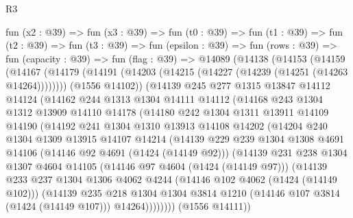 \begin{lexlean}{R3}
\begin{coremodule}
  fun (x2 : @39) =>
  fun (x3 : @39) =>
  fun (t0 : @39) =>
  fun (t1 : @39) =>
  fun (t2 : @39) =>
  fun (t3 : @39) =>
  fun (epsilon : @39) =>
  fun (rows : @39) =>
  fun (capacity : @39) =>
  fun (flag : @39) =>
  @14089
    (@14138
      (@14153
        (@14159
          (@14167
            (@14179 (@14191 (@14203 (@14215 (@14227 (@14239 (@14251 (@14263 @14264))))))))
            (@1556 @14102))
          (@14139
            @245
            @277
            @1315
            @13847
            @14112
            @14124
            (@14162
              @244
              @1313
              @1304
              @14111
              @14112
              (@14168
                @243
                @1304
                @1312
                @13909
                @14110
                @14178
                (@14180
                  @242
                  @1304
                  @1311
                  @13911
                  @14109
                  @14190
                  (@14192
                    @241
                    @1304
                    @1310
                    @13913
                    @14108
                    @14202
                    (@14204
                      @240
                      @1304
                      @1309
                      @13915
                      @14107
                      @14214
                      (@14139
                        @229
                        @239
                        @1304
                        @1308
                        @4691
                        @14106
                        (@14146 @92 @4691 (@1424 (@14149 @92)))
                        (@14139
                          @231
                          @238
                          @1304
                          @1307
                          @4604
                          @14105
                          (@14146 @97 @4604 (@1424 (@14149 @97)))
                          (@14139
                            @233
                            @237
                            @1304
                            @1306
                            @4062
                            @4244
                            (@14146 @102 @4062 (@1424 (@14149 @102)))
                            (@14139
                              @235
                              @218
                              @1304
                              @1304
                              @3814
                              @1210
                              (@14146 @107 @3814 (@1424 (@14149 @107)))
                              @14264))))))))
              (@1556 @14111))

\end{coremodule}
\end{lexlean}
